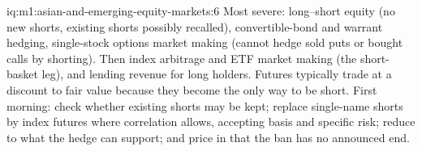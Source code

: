 \begin{solution}{iq:m1:asian-and-emerging-equity-markets:6}
Most severe: long--short equity (no new shorts, existing shorts possibly
recalled), convertible-bond and warrant hedging, single-stock options market
making (cannot hedge sold puts or bought calls by shorting). Then index
arbitrage and ETF market making (the short-basket leg), and lending revenue
for long holders. Futures typically trade at a discount to fair value because
they become the only way to be short. First morning: check whether existing
shorts may be kept; replace single-name shorts by index futures where
correlation allows, accepting basis and specific risk; reduce 
to what the hedge can support; and price in that the ban has no announced
end.
\end{solution}
